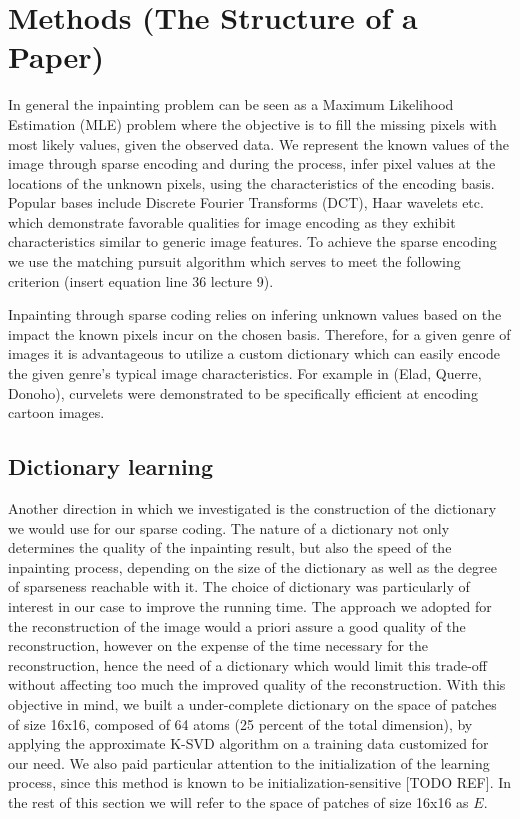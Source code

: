 \section{Methods (The Structure of a Paper)}
\label{sec:methods}
\label{sec:structure-paper}

In general the inpainting problem can be seen as a Maximum Likelihood Estimation (MLE) problem where the objective is to fill the missing pixels with most likely values, given the observed data. We represent the known values of the image through sparse encoding and during the process, infer pixel values at the locations of the unknown pixels, using the characteristics of the encoding basis. Popular bases include Discrete Fourier Transforms (DCT), Haar wavelets etc. which demonstrate favorable qualities for image encoding as they exhibit characteristics similar to generic image features. To achieve the sparse encoding we use the matching pursuit algorithm which serves to meet the following criterion (insert equation line 36 lecture 9).

Inpainting through sparse coding relies on infering unknown values based on the impact the known pixels incur on the chosen basis. Therefore, for a given genre of images it is advantageous to utilize a custom dictionary which can easily encode the given genre's typical image characteristics. For example  in (Elad, Querre, Donoho), curvelets were demonstrated to be specifically efficient at encoding cartoon images.


\subsection{Dictionary learning}

Another direction in which we investigated is the construction of the dictionary we would use for our sparse coding. The nature of a dictionary not only determines the quality of the inpainting result, but also the speed of the inpainting process, depending on the size of the dictionary as well as the degree of sparseness reachable with it. 
The choice of dictionary was particularly of interest in our case to improve the running time. The approach we adopted for the reconstruction of the image would a priori assure a good quality of the reconstruction, however on the expense of the time necessary for the reconstruction, hence the need of a dictionary which would limit this trade-off without affecting too much the improved quality of the reconstruction.
With this objective in mind, we built a under-complete dictionary on the space of patches of size 16x16, composed of 64 atoms (25 percent of the total dimension), by applying the approximate K-SVD algorithm on a training data customized for our need. We also paid particular attention to the initialization of the learning process, since this method is known to be initialization-sensitive [TODO REF]. In the rest of this section we will refer to the space of patches of size 16x16 as $E$.

